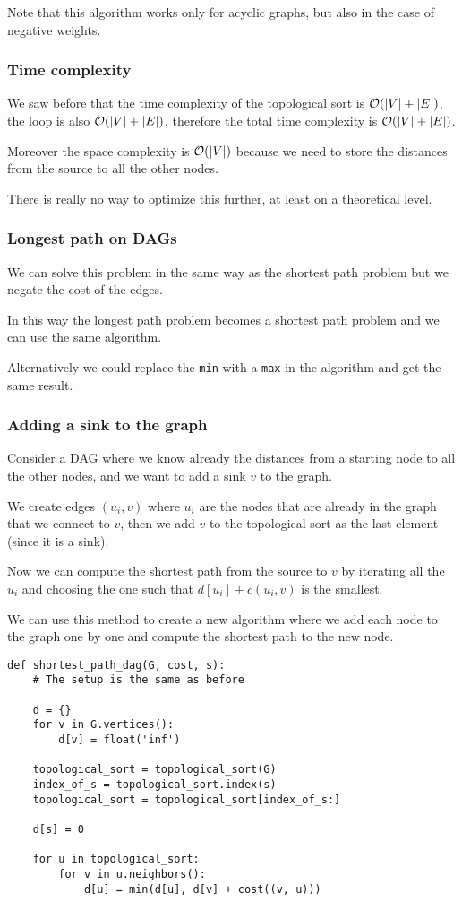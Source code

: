 \documentclass[14pt]{extarticle}
\begin{document}
Note that this algorithm works only for acyclic graphs, but also in the case of negative weights.

\subsubsection{Time complexity}

We saw before that the time complexity of the topological sort is $\mathcal{O}(|V| + |E|)$, the loop is also $\mathcal{O}(|V| + |E|)$, therefore the total time complexity is $\mathcal{O}(|V| + |E|)$.

Moreover the space complexity is $\mathcal{O}(|V|)$ because we need to store the distances from the source to all the other nodes.

There is really no way to optimize this further, at least on a theoretical level.

\subsubsection{Longest path on DAGs}

We can solve this problem in the same way as the shortest path problem but we negate the cost of the edges.

In this way the longest path problem becomes a shortest path problem and we can use the same algorithm.

Alternatively we could replace the \texttt{min} with a \texttt{max} in the algorithm and get the same result.

\subsubsection{Adding a sink to the graph}

Consider a DAG where we know already the distances from a starting node to all the other nodes, and we want to add a sink $v$ to the graph.

We create edges $(u_i, v)$ where $u_i$ are the nodes that are already in the graph that we connect to $v$, then we add $v$ to the topological sort as the last element (since it is a sink).

Now we can compute the shortest path from the source to $v$ by iterating all the $u_i$ and choosing the one such that $d[u_i] + c(u_i, v)$ is the smallest.

We can use this method to create a new algorithm where we add each node to the graph one by one and compute the shortest path to the new node.

\begin{verbatim}
def shortest_path_dag(G, cost, s):
    # The setup is the same as before

    d = {}
    for v in G.vertices():
        d[v] = float('inf')

    topological_sort = topological_sort(G)
    index_of_s = topological_sort.index(s)
    topological_sort = topological_sort[index_of_s:]

    d[s] = 0

    for u in topological_sort:
        for v in u.neighbors():
            d[u] = min(d[u], d[v] + cost((v, u)))
\end{verbatim}
\end{document}
